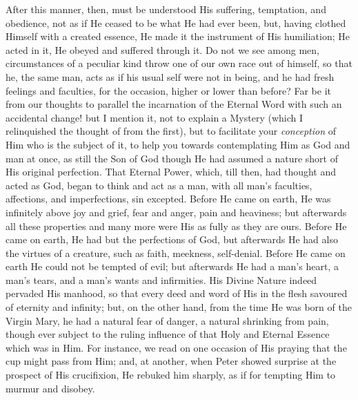 After this manner, then, must be understood His suffering,
temptation, and obedience, not as if He ceased to be what He had ever
been, but, having clothed Himself with a created essence, He made it
the instrument of His humiliation; He acted in it, He obeyed and
suffered through it. Do not we see among men, circumstances of a
peculiar kind throw one of our own race out of himself, so that he,
the same man, acts as if his usual self were not in being, and he had
fresh feelings and faculties, for the occasion, higher or lower than
before? Far be it from our thoughts to parallel the incarnation of the
Eternal Word with such an accidental change! but I mention it, not to
explain a Mystery (which I relinquished the thought of from the
first), but to facilitate your \emph{conception} of Him who is the
subject of it, to help you towards contemplating Him as God and man at
once, as still the Son of God though He had assumed a nature short of
His original perfection. That Eternal Power, which, till then, had
thought and acted as God, began to think and act as a man, with all
man's faculties, affections, and imperfections, sin excepted. Before
He came on earth, He was infinitely above joy and grief, fear and
anger, pain and heaviness; but afterwards all these properties and
many more were His as fully as they are ours. Before He came on earth,
He had but the perfections of God, but afterwards He had also the
virtues of a creature, such as faith, meekness, self-denial. Before He
came on earth He could not be tempted of evil; but afterwards He had a
man's heart, a man's tears, and a man's wants and infirmities. His
Divine Nature indeed pervaded His manhood, so that every deed and word
of His in the flesh savoured of eternity and infinity; but, on the
other hand, from the time He was born of the Virgin Mary, he had a
natural fear of danger, a natural shrinking from pain, though ever
subject to the ruling influence of that Holy and Eternal Essence which
was in Him. For instance, we read on one occasion of His praying that
the cup might pass from Him; and, at another, when Peter showed
surprise at the prospect of His crucifixion, He rebuked him sharply,
as if for tempting Him to murmur and disobey.

